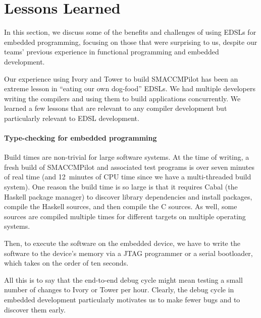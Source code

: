 \section{Lessons Learned}
\label{sec:thegood}

In this section, we discuss some of the benefits and challenges of
using EDSLs for embedded programming, focusing on those that were surprising to
us, despite our teams' previous experience in functional programming and
embedded development.

Our experience using Ivory and Tower to build SMACCMPilot has been an extreme
lesson in ``eating our own dog-food'' EDSLs.  We had multiple developers writing the compilers
and using them to build applications concurrently.  We learned a few lessons
that are relevant to any compiler development but particularly relevant to EDSL
development.

\paragraph{Type-checking for embedded programming}
Build times are non-trivial for large software systems.  At the time of writing,
a fresh build of SMACCMPilot and associated test programs is over seven minutes
of real time (and 12~minutes of CPU time since we have a multi-threaded build
system).  One reason the build time is so large is that it requires Cabal (the
Haskell package manager) to discover library dependencies and install packages,
compile the Haskell sources, and then compile the C sources.  As well, some
sources are compiled multiple times for different targets on
multiple operating systems.

Then, to execute the software on the embedded device, we have to write the
software to the device's memory via a JTAG programmer or a serial bootloader,
which takes on the order of ten seconds.

All this is to say that the end-to-end debug cycle might mean testing a small
number of changes to Ivory or Tower per hour.  Clearly, the debug cycle in
embedded development particularly motivates us to make fewer bugs and to
discover them early.



